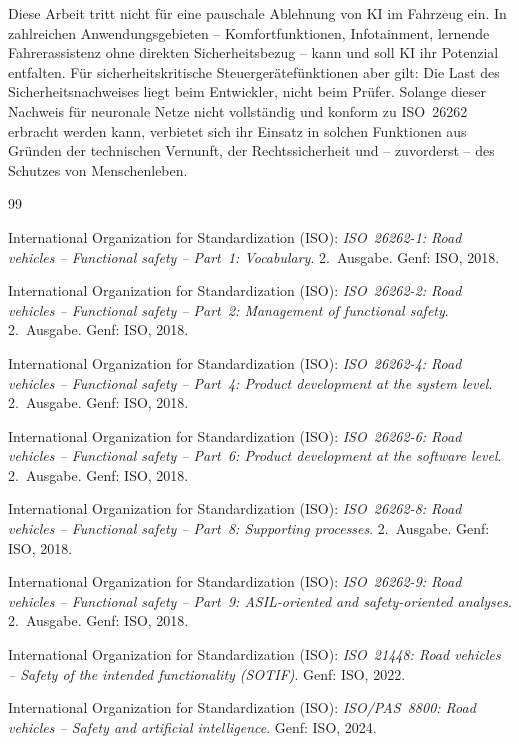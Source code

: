 ﻿\documentclass[12pt,a4paper]{article}
\begin{document}
\bigskip
\noindent Diese Arbeit tritt nicht f\"ur eine pauschale Ablehnung von KI im
Fahrzeug ein. In zahlreichen Anwendungsgebieten -- Komfortfunktionen, Infotainment,
lernende Fahrerassistenz ohne direkten Sicherheits\-bezug -- kann und soll KI ihr
Potenzial entfalten. F\"ur sicherheitskritische Steuerger\"atef\"unktionen aber
gilt: Die Last des Sicherheitsnachweises liegt beim Entwickler, nicht beim Pr\"ufer.
Solange dieser Nachweis f\"ur neuronale Netze nicht vollst\"andig und konform zu
ISO~26262 erbracht werden kann, verbietet sich ihr Einsatz in solchen Funktionen
aus Gr\"unden der technischen Vernunft, der Rechtssicherheit und -- zuvorderst --
des Schutzes von Menschenleben.

\begin{thebibliography}{99}

International Organization for Standardization (ISO):
\textit{ISO~26262-1: Road vehicles -- Functional safety -- Part~1: Vocabulary}.
2.~Ausgabe. Genf: ISO, 2018.

International Organization for Standardization (ISO):
\textit{ISO~26262-2: Road vehicles -- Functional safety -- Part~2: Management of functional safety}.
2.~Ausgabe. Genf: ISO, 2018.

International Organization for Standardization (ISO):
\textit{ISO~26262-4: Road vehicles -- Functional safety -- Part~4: Product development at the system level}.
2.~Ausgabe. Genf: ISO, 2018.

International Organization for Standardization (ISO):
\textit{ISO~26262-6: Road vehicles -- Functional safety -- Part~6: Product development at the software level}.
2.~Ausgabe. Genf: ISO, 2018.

International Organization for Standardization (ISO):
\textit{ISO~26262-8: Road vehicles -- Functional safety -- Part~8: Supporting processes}.
2.~Ausgabe. Genf: ISO, 2018.

International Organization for Standardization (ISO):
\textit{ISO~26262-9: Road vehicles -- Functional safety -- Part~9: ASIL-oriented and safety-oriented analyses}.
2.~Ausgabe. Genf: ISO, 2018.

International Organization for Standardization (ISO):
\textit{ISO~21448: Road vehicles -- Safety of the intended functionality (SOTIF)}.
Genf: ISO, 2022.

International Organization for Standardization (ISO):
\textit{ISO/PAS~8800: Road vehicles -- Safety and artificial intelligence}.
Genf: ISO, 2024.


\end{thebibliography}
\end{document}
